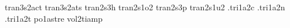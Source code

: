 {tran3s2act                                                                      
tran3s2ats                                                                      
tran2s3h                                                                        
tran2s1o2                                                                       
tran2s3p                                                                        
tran2s1u2                                                                       
.tri1a2c                                                                        
.tri1a2n                                                                        
.tri1a2t                                                                        
po1astre                                                                        
vol2tiamp                                                                       
}                                                                               
\hyphenation{ %
}                                                                               
